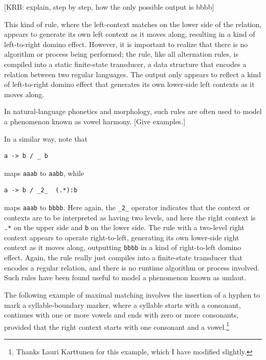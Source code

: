 [KRB:  explain, step by step, how the only possible output is bbbb]

This kind of rule, where the left-context matches on
the lower side of the relation, appears to generate its own left context as it moves
along, resulting in a kind of left-to-right domino effect.  However, it is
important to realize that there is no algorithm or process being performed; the rule,
like all alternation rules, is compiled into a static finite-state transducer, a data
structure that encodes a
relation between two regular languages.  The output only appears to reflect a kind of
left-to-right domino effect that generates its own lower-side left contexts as it
moves along.

In natural-language phonetics and morphology, such rules are often used to model a phenomenon known
as vowel harmony.  [Give examples.]

In a similar way, note that

\begin{Verbatim}
a -> b / _ b
\end{Verbatim}

\noindent
maps \texttt{aaab} to \texttt{aabb}, while

\begin{Verbatim}
a -> b / _2_  (.*):b
\end{Verbatim}

\noindent
maps \texttt{aaab} to \texttt{bbbb}.  Here again, the \verb!_2_! operator indicates that the context or contexts are to
be interpreted as having two levels, and here the right context is \verb!.*! on the upper side and \verb!b! on the lower
side.  The rule with a two-level right context appears to
operate right-to-left, generating its own lower-side right context as it moves along, outputting \texttt{bbbb} in a kind
of right-to-left domino effect.
Again, the rule really just compiles into a finite-state transducer that encodes a regular
relation, and there is no runtime algorithm or process involved.
Such rules have been found useful to model a phenomenon known as umlaut.

The following example of maximal matching involves the insertion of a hyphen to mark a syllable-boundary
marker, where a syllable starts with a
consonant, continues with one or more vowels and ends with zero or more consonants,
provided that the right context starts with one consonant and a vowel.\footnote{Thanks
Lauri Karttunen for this example, which I have modified slightly.}

